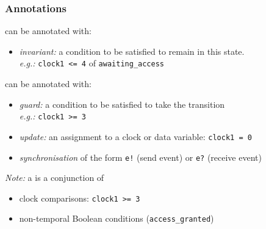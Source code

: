 \documentclass{beamer}
\begin{document}
\begin{frame}[fragile]\frametitle{Annotations}

   can be annotated with:
  \begin{itemize}
  \item \emph{invariant:} a condition to be satisfied to remain in this state.\\
    \emph{e.g.:} \texttt{clock1 <= 4} of \texttt{awaiting\_access}
  \end{itemize}

  \vspace{3mm}
   can be annotated with:
  \begin{itemize}
  \item \emph{guard:} a condition to be satisfied to take the transition\\
        \emph{e.g.:} \texttt{clock1 >= 3} 
  \item \emph{update:} an assignment to a clock or data variable:
         \texttt{clock1 = 0} 
      \item \emph{synchronisation} of the form \texttt{e!} (send event) or
        \texttt{e?} (receive event)
  \end{itemize}

  \vspace{3mm}
  \emph{Note:} a  is a conjunction of
  \begin{itemize}
  \item clock comparisons: \texttt{clock1 >= 3}
  \item non-temporal Boolean conditions (\texttt{access\_granted})
  \end{itemize}
  
\end{frame}
\end{document}

